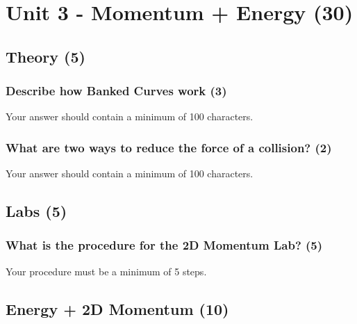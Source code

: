 \documentclass{article}
\begin{document}
\section{Unit 3 - Momentum + Energy (30)}
\subsection{Theory (5)}
\subsubsection{Describe how Banked Curves work (3)}
Your answer should contain a minimum of 100 characters.

\subsubsection{What are two ways to reduce the force of a collision? (2)}
Your answer should contain a minimum of 100 characters.

\subsection{Labs (5)}
\subsubsection{What is the procedure for the 2D Momentum Lab? (5)}
Your procedure must be a minimum of 5 steps.

\subsection{Energy + 2D Momentum (10)}

\vspace{5pt}
\end{document}
